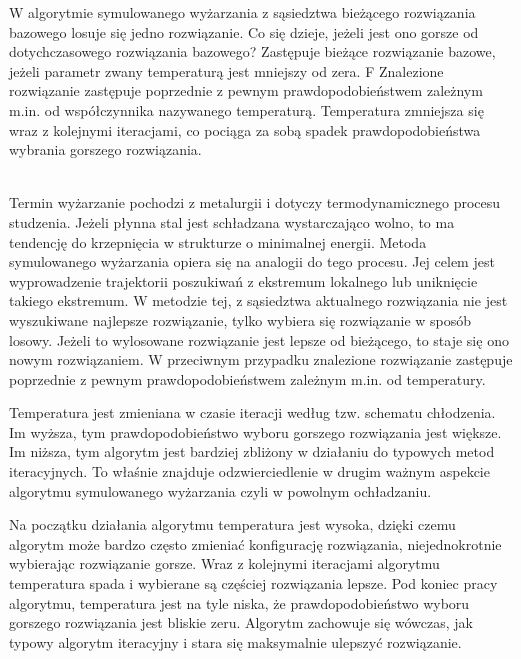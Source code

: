 \answer
{W algorytmie symulowanego wyżarzania z sąsiedztwa bieżącego rozwiązania bazowego losuje się jedno rozwiązanie. Co się dzieje, jeżeli jest ono gorsze od dotychczasowego rozwiązania bazowego?}
{Zastępuje bieżące rozwiązanie bazowe, jeżeli parametr zwany temperaturą jest mniejszy od zera.}
{F}
{Znalezione rozwiązanie zastępuje poprzednie z pewnym prawdopodobieństwem zależnym m.in. od współczynnika nazywanego temperaturą. Temperatura zmniejsza się wraz z kolejnymi iteracjami, co pociąga za sobą spadek prawdopodobieństwa wybrania gorszego rozwiązania.}
{ \\
Termin wyżarzanie pochodzi z metalurgii i dotyczy termodynamicznego procesu studzenia. Jeżeli płynna stal jest schładzana wystarczająco wolno, to ma tendencję do krzepnięcia w strukturze o minimalnej energii. Metoda symulowanego wyżarzania opiera się na analogii do tego procesu. Jej celem jest wyprowadzenie trajektorii poszukiwań z ekstremum lokalnego lub uniknięcie takiego ekstremum. W metodzie tej, z sąsiedztwa aktualnego rozwiązania nie jest wyszukiwane najlepsze rozwiązanie, tylko wybiera się rozwiązanie w sposób losowy. Jeżeli to wylosowane rozwiązanie jest lepsze od bieżącego, to staje się ono nowym rozwiązaniem. W przeciwnym przypadku znalezione rozwiązanie zastępuje poprzednie z pewnym prawdopodobieństwem zależnym m.in. od temperatury. 

Temperatura jest zmieniana w czasie iteracji według tzw. schematu chłodzenia. Im wyższa, tym prawdopodobieństwo wyboru gorszego rozwiązania jest większe. Im niższa, tym algorytm jest bardziej zbliżony w działaniu do typowych metod iteracyjnych. To właśnie znajduje odzwierciedlenie w drugim ważnym aspekcie algorytmu symulowanego wyżarzania czyli w powolnym ochładzaniu.

Na początku działania algorytmu temperatura jest wysoka, dzięki czemu algorytm może bardzo często zmieniać konfigurację rozwiązania, niejednokrotnie wybierając rozwiązanie gorsze. Wraz z kolejnymi iteracjami algorytmu temperatura spada i wybierane są częściej rozwiązania lepsze. Pod koniec pracy algorytmu, temperatura jest na tyle niska, że prawdopodobieństwo wyboru gorszego rozwiązania jest bliskie zeru. Algorytm zachowuje się wówczas, jak typowy algorytm iteracyjny i stara się maksymalnie ulepszyć rozwiązanie.
}




